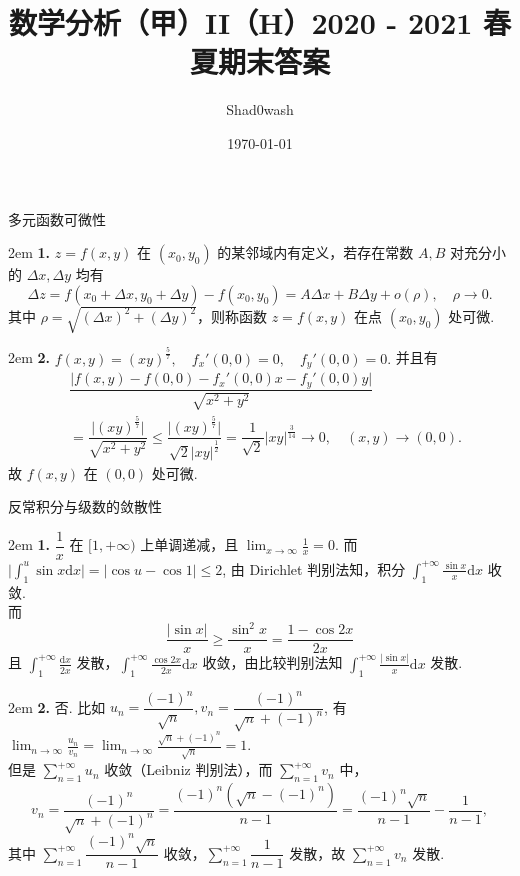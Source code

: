\documentclass[UTF8,14pt,normal]{ctexart}
\title{数学分析（甲）II（H）2020 - 2021 春夏期末答案}
\author{Shad0wash}
\date{\today}
\begin{document}
\maketitle

多元函数可微性

    \hangindent 2em
    \noindent
    \textbf{1.} \(z = f(x, y)\) 在 \((x_0, y_0)\) 的某邻域内有定义，若存在常数 \(A, B\) 对充分小的 \(\Delta x, \Delta y\) 均有
    \[
        \Delta z = f(x_0 + \Delta x, y_0 + \Delta y) - f(x_0, y_0) = A \Delta x + B \Delta y + o(\rho), \quad \rho \rightarrow 0.
    \]
    其中 \(\rho = \sqrt{(\Delta x)^2 + (\Delta y)^2}\)，则称函数 \(z = f(x, y)\) 在点 \((x_0, y_0)\) 处可微.

    \hangindent 2em
    \noindent
    \textbf{2.} \(f(x, y) = (xy)^{\frac{5}{7}}, \quad f_x'(0, 0) = 0, \quad f_y'(0, 0) = 0.\) 并且有
    \begin{align*}
        & \dfrac{\lvert f(x, y) - f(0, 0) - f_x'(0, 0)x - f_y'(0, 0)y \rvert}{\sqrt{x^2 + y^2}} \\ & = \dfrac{\lvert (xy)^{\frac{5}{7}} \rvert}{\sqrt{x^2 + y^2}} \leqslant \dfrac{\lvert (xy)^{\frac{5}{7}} \rvert}{\sqrt{2} \lvert xy \rvert^{\frac{1}{2}}} = \dfrac{1}{\sqrt{2}} \lvert xy \rvert^{\frac{3}{14}} \rightarrow 0, \quad (x, y) \rightarrow (0, 0).
    \end{align*}
    故 \(f(x, y)\) 在 \((0, 0)\) 处可微.

反常积分与级数的敛散性
    
    \hangindent 2em
    \noindent
    \textbf{1.} \(\dfrac{1}{x}\) 在 \([1, +\infty)\) 上单调递减，且 \(\lim_{x \to \infty} \frac{1}{x} = 0\). 而 \(\lvert \int_1^u \sin x \mathrm{d}x \rvert = \lvert \cos u - \cos 1 \rvert \leqslant 2\), 由 Dirichlet 判别法知，积分 \(\int_1^{+\infty} \frac{\sin x}{x} \mathrm{d}x\) 收敛. \\
    而 
    \[
        \dfrac{\lvert \sin x \rvert}{x} \geqslant \dfrac{\sin^2 x}{x} = \dfrac{1 - \cos 2x}{2x} 
    \]
    且 \(\int_1^{+\infty} \frac{\mathrm{d} x}{2x}\) 发散，\(\int_1^{+\infty} \frac{\cos 2x}{2x} \mathrm{d}x\) 收敛，由比较判别法知 \(\int_1^{+\infty} \frac{\lvert \sin x \rvert}{x} \mathrm{d}x\) 发散.

    \hangindent 2em
    \noindent
    \textbf{2.} 否. 比如 \(u_n = \dfrac{(-1)^n}{\sqrt{n}}, v_n = \dfrac{(-1)^n}{\sqrt{n} + (-1)^n}\), 有 \(\lim_{n \to \infty} \frac{u_n}{v_n} = \lim_{n \to \infty} \frac{\sqrt{n} + (-1)^n}{\sqrt{n}} = 1\). \\ 但是 \(\sum_{n = 1}^{+\infty} u_n\) 收敛（Leibniz 判别法），而 \(\sum_{n = 1}^{+\infty} v_n\) 中，
    \[
        v_n = \dfrac{(-1)^n}{\sqrt{n} + (-1)^n} = \dfrac{(-1)^n(\sqrt{n} - (-1)^n)}{n - 1} = \dfrac{(-1)^n\sqrt{n}}{n - 1} - \dfrac{1}{n - 1},
    \]
    其中 \(\sum_{n = 1}^{+\infty} \dfrac{(-1)^n\sqrt{n}}{n - 1}\) 收敛，\(\sum_{n = 1}^{+\infty} \dfrac{1}{n - 1}\) 发散，故 \(\sum_{n = 1}^{+\infty} v_n\) 发散.
\end{document}
